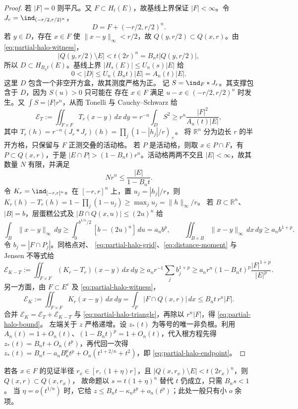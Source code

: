 \begin{proof}
若 $|F|=0$ 则平凡。又 $F\subset H_t(E)$，故基线上界保证 $|F|<\infty$。令 $J_r=\ind_{(-r/2,r/2)^n}$，
\[
D=F+(-r/2,r/2)^n.
\]
若 $y\in D$，存在 $x\in F$ 使 $\|x-y\|_\infty<r/2$，故 $Q(y,r/2)\subset Q(x,r)$。由 \eqref{eq:partial-halo-witness}，
\[
|Q(y,r/2)\setminus E|<t(2r)^n=B_n t|Q(y,r/2)|,
\]
所以 $D\subset H_{B_n t}(E)$。基线上界 $|H_s(E)|\le U_n(s)|E|$ 给
\begin{equation}\label{eq:partial-halo-D}
0<|D|\le U_n(B_n t)|E|=A_n(t)|E|.
\end{equation}
这里 $D$ 包含一个非空开方盒，故其测度严格为正。 记 $S=\ind_F*J_r$。其支撑包含于 $D$，因为 $S(u)>0$ 只可能在 存在 $x\in F$ 满足 $u-x\in(-r/2,r/2)^n$ 时发生。又 $\int S=|F|r^n$，从而 Tonelli 与 Cauchy--Schwarz 给
\begin{equation}\label{eq:partial-halo-triangle}
\mathcal E_T:=\iint_{F\times F}T_r(x-y)\,dx\,dy =r^{-n}\int_D S^2 \ge r^n\frac{|F|^2}{A_n(t)|E|},
\end{equation}
其中 $T_r(h)=r^{-n}(J_r*J_r)(h)=\prod_j(1-|h_j|/r)_+$。 将 $\mathbb R^n$ 分为边长 $r$ 的半开方格，只保留与 $F$ 正测交叠的活动格。 若 $P$ 是活动格，则取 $x\in P\cap F$，有 $P\subset Q(x,r)$，于是 $|E\cap P|>(1-B_n t)r^n$。活动格两两不交且 $|E|<\infty$，故其数量 $N$ 有限，并满足
\begin{equation}\label{eq:partial-halo-grid}
Nr^n\le\frac{|E|}{1-B_n t}.
\end{equation}
令 $K_r=\ind_{[-r,r]^n}$。在 $[-r,r]^n$ 上，置 $u_j=|h_j|/r$，则 $K_r(h)-T_r(h)=1-\prod_j(1-u_j)\ge\max_j u_j=\|h\|_\infty/r$。 若 $B\subset\mathbb R^n$、$|B|=b$，层蛋糕公式及 $|B\cap Q(x,u)|\le(2u)^n$ 给
\begin{equation}\label{eq:distance-moment}
\int_B\|x-y\|_\infty\,dy \ge\int_0^{b^{1/n}/2}[b-(2u)^n]\,du=a_nb^p, \qquad \iint_{B\times B}\|x-y\|_\infty\,dx\,dy\ge a_nb^{1+p}.
\end{equation}
令 $b_j=|F\cap P_j|$。同格点对、 \eqref{eq:partial-halo-grid}、\eqref{eq:distance-moment} 与 Jensen 不等式给
\[
\mathcal E_{K-T}:=\iint_{F\times F}(K_r-T_r)(x-y)\,dx\,dy \ge a_nr^{-1}\sum_jb_j^{1+p} \ge a_nr^n(1-B_n t)^p\frac{|F|^{1+p}}{|E|^p}.
\]
另一方面，由 $F\subset E^c$ 及 \eqref{eq:partial-halo-witness}，
\[
\mathcal E_K:=\iint_{F\times F}K_r(x-y)\,dx\,dy =\int_F|F\cap Q(x,r)|\,dx\le B_n t\,r^n|F|.
\]
合并 $\mathcal E_K=\mathcal E_T+\mathcal E_{K-T}$ 与 \eqref{eq:partial-halo-triangle}，再除以 $r^n|F|$，得 \eqref{eq:partial-halo-bound}。 左端关于 $z$ 严格递增。设 $z_*(t)$ 为等号的唯一非负根。利用 $A_n(t)=1+O_n(t)$、$(1-B_n t)^p=1+O_n(t)$，代入根方程先得 $z_*(t)=B_n t+O_n(t^p)$，再代回一次得 $z_*(t)=B_n t-a_nB_n^pt^p+O_n(t^{1+2/n}+t^2)$，即 \eqref{eq:partial-halo-endpoint}。\qedhere
\end{proof}
\begin{remark}[近同半径带]
若各 $x\in F$ 的见证半径 $r_x\in[r,(1+\eta)r]$，且 $|Q(x,r_x)\setminus E|<t(2r_x)^n$，则 $Q(x,r)\subset Q(x,r_x)$， 故命题以 $s=t(1+\eta)^n$ 替代 $t$ 仍成立，只需 $B_n s<1$。 当 $\eta=o(t^{1/n})$ 时，它给 $z\le B_n t-\kappa_nt^p+o_n(t^p)$；此处一般只有小 $o$ 余项。
\end{remark}
